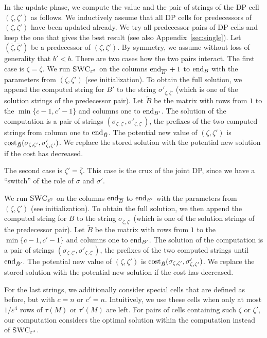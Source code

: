 In the update phase, we compute the value and the pair of strings of the DP cell $(\zeta,\zeta')$ as follows. 
We inductively assume that all DP cells for predecessors of $(\zeta,\zeta')$ have been updated already.
We try all predecessor pairs of DP cells and keep the one that gives the best result (see also Appendix~\ref{sec:single}).
Let $(\overline{\zeta},\overline{\zeta}')$ be a predecessor of $(\zeta,\zeta')$.
By symmetry, we assume without loss of generality that $b' < b$. 
There are two cases how the two pairs interact.
The first case is $\zeta = \overline{\zeta}$.
We run $\textsc{SWC}_{\varepsilon^3}$ on the columns $\textrm{end}_{\overline{B}'}+1$ to $\textrm{end}_{B}$ with the parameters from $(\zeta,\zeta')$ (see initialization).
To obtain the full solution, we append the computed string for $B'$ to the string $\sigma'_{\zeta,\overline{\zeta}'}$ (which is one of the solution strings of the predecessor pair).
Let $\tilde{B}$ be the matrix with rows from $1$ to the $\min\{c - 1,c' - 1\}$ and columns one to $\textrm{end}_{B'}$.
The solution of the computation is a pair of strings $(\sigma_{\zeta,\zeta'},\sigma'_{\zeta,\zeta'})$, the prefixes of the two computed strings from column one to $\textrm{end}_{\tilde{B}}$.
The potential new value of $(\zeta,\zeta')$ is $\mathrm{cost}_{\tilde{B}}(\sigma_{\zeta,\zeta'},\sigma'_{\zeta,\zeta'})$.
We replace the stored solution with the potential new solution if the cost has decreased.

The second case is $\zeta' = \overline{\zeta}$.
This case is the crux of the joint DP, since we have a ``switch'' of the role of $\sigma$ and $\sigma'$.

We run $\textsc{SWC}_{\varepsilon^3}$ on the columns $\textrm{end}_{\overline{B}}$ to $\textrm{end}_{B'}$ with the parameters from $(\zeta,\zeta')$ (see initialization).
To obtain the full solution, we then append the computed string for $B$ to the string $\sigma_{\overline{\zeta},\zeta'}$ (which is one of the solution strings of the predecessor pair).
Let $\tilde{B}$ be the matrix with rows from $1$ to the $\min\{c - 1,c' - 1\}$ and columns one to $\textrm{end}_{B'}$.
The solution of the computation is a pair of strings $(\sigma_{\zeta,\zeta'},\sigma'_{\zeta,\zeta'})$, the prefixes of the two computed strings until $\textrm{end}_{\tilde{B}'}$.
The potential new value of $(\zeta,\zeta')$ is $\mathrm{cost}_{\tilde{B}}(\sigma_{\zeta,\zeta'},\sigma'_{\zeta,\zeta'})$.
We replace the stored solution with the potential new solution if the cost has decreased.

For the last strings,
we additionally consider special cells that are defined as before, but with $c=n$ or $c'=n$. 
Intuitively, we use these cells when only at most $1/\varepsilon^4$ rows of $\tau(M)$ or $\tau'(M)$ are left.
For pairs of cells containing such $\zeta$ or $\zeta'$, our computation considers the optimal solution within the computation instead of $\textsc{SWC}_{\varepsilon^3}$.

